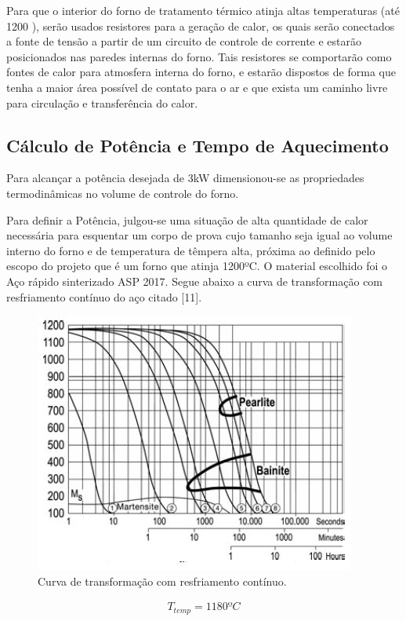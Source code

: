 Para que o interior do forno de tratamento térmico atinja altas temperaturas (até 1200 ), serão usados resistores para a geração de calor, os quais serão conectados a fonte de tensão a partir de um circuito de controle de corrente e estarão posicionados nas paredes internas do forno. Tais resistores se comportarão como fontes de calor para atmosfera interna do forno, e estarão dispostos de forma que tenha a maior área possível de contato para o ar e que exista um caminho livre para circulação e transferência do calor.

\subsection{Cálculo de Potência e Tempo de Aquecimento}

Para alcançar a potência desejada de 3kW dimensionou-se as propriedades termodinâmicas no volume de controle do forno.

Para definir a Potência, julgou-se uma situação de alta quantidade de calor necessária para esquentar um corpo de prova cujo tamanho seja igual ao volume interno do forno e de temperatura de têmpera alta, próxima ao definido pelo escopo do projeto que é um forno que atinja 1200ºC. O material escolhido foi o Aço rápido sinterizado ASP 2017. Segue abaixo a curva de transformação com resfriamento contínuo do aço citado [11].
\begin{figure}[!h]
	\centering
	\label{transf_continuo}
	\includegraphics[keepaspectratio=true,scale=0.8]{figuras/transf_continuo.JPG}
	\caption{Curva de transformação com resfriamento contínuo.}
\end{figure}

\begin{align}
	T_{temp} = 1180 ºC
\end{align}

